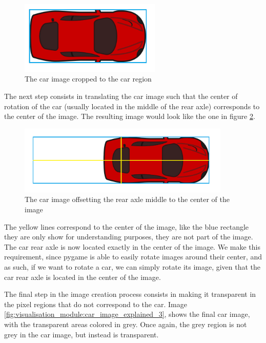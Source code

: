 \begin{figure}[h!]
  \centering
    \includegraphics[width=0.6\textwidth]{car_image_explained_1}
    \caption{The car image cropped to the car region \label{fig:visualisation_module:car_image_explained_1} }
\end{figure}

The next step consists in translating the car image such that the center of rotation of the car (usually located in the middle of the rear axle) corresponds to the center of the image. The resulting image would look like the one in figure \ref{fig:visualisation_module:car_image_explained_2}.

\begin{figure}[h!]
  \centering
    \includegraphics[width=0.9\textwidth]{car_image_explained_2}
    \caption{The car image offsetting the rear axle middle to the center of the image\label{fig:visualisation_module:car_image_explained_2} }
\end{figure}

The yellow lines correspond to the center of the image, like the blue rectangle they are only show for understanding purposes, they are not part of the image. The car rear axle is now located exactly in the center of the image. We make this requirement, since pygame is able to easily rotate images around their center, and as such, if we want to rotate a car, we can simply rotate its image, given that the car rear axle is located in the center of the image.

The final step in the image creation process consists in making it transparent in the pixel regions that do not correspond to the car. Image \ref{fig:visualisation_module:car_image_explained_3}, shows the final car image, with the transparent areas colored in grey. Once again, the grey region is not grey in the car image, but instead is transparent.

